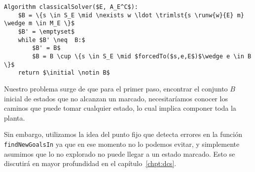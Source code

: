 \begin{lstlisting}[language={pseudocode},label={lst:classical},caption={Algoritmo Monolítico},float=ht]
Algorithm classicalSolver($E, A_E^C$):
	$B = \{s \in S_E \mid \nexists w \ldot \trimlst{s \runw{w}{E} m} \wedge m \in M_E \}$
	$B' = \emptyset$
	while $B' \neq  B:$
		$B' = B$
		$B = B \cup \{s \in S_E \mid $forcedTo($s,e,E$)$\wedge e \in B \}$
	return $\initial \notin B$
\end{lstlisting}

Nuestro problema surge de que para el primer paso, encontrar el conjunto $B$ inicial de estados que no alcanzan un marcado, necesitaríamos conocer los caminos que puede tomar cualquier estado, lo cual implica componer toda la planta.

Sin embargo, utilizamos la idea del punto fijo que detecta errores en la función \texttt{findNewGoalsIn} ya que en ese momento no lo podemos evitar, y simplemente asumimos que lo no explorado no puede llegar a un estado marcado. Esto se discutirá en mayor profundidad en el capítulo~\ref{chpt:dcs}.
